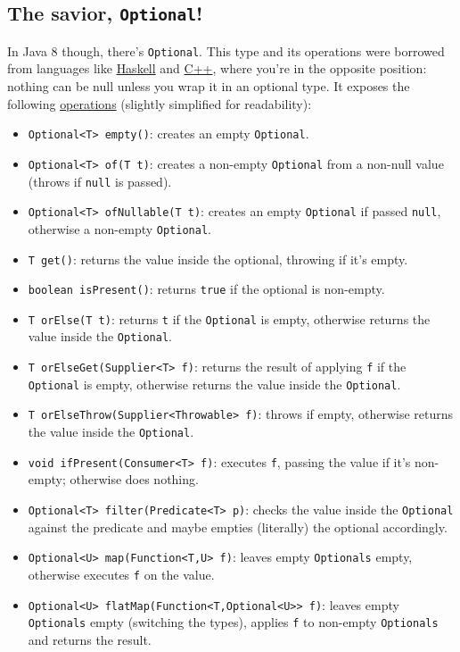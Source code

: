 \documentclass[11pt]{article}
\begin{document}
\subsection*{The savior, \texttt{Optional}!}
\label{sec:orgheadline3}
In Java 8 though, there's \texttt{Optional}. This type and its operations were borrowed from languages like \href{https://hackage.haskell.org/package/base/docs/Data-Maybe.html}{Haskell} and \href{http://en.cppreference.com/w/cpp/utility/optional/optional}{C++}, where you're in the opposite position: nothing can be null unless you wrap it in an optional type. It exposes the following \href{https://docs.oracle.com/javase/8/docs/api/java/util/Optional.html}{operations} (slightly simplified for readability):

\begin{itemize}
\item \texttt{Optional<T> empty()}: creates an empty \texttt{Optional}.
\item \texttt{Optional<T> of(T t)}: creates a non-empty \texttt{Optional} from a non-null value (throws if \texttt{null} is passed).
\item \texttt{Optional<T> ofNullable(T t)}: creates an empty \texttt{Optional} if passed \texttt{null}, otherwise a non-empty \texttt{Optional}.
\item \texttt{T get()}: returns the value inside the optional, throwing if it's empty.
\item \texttt{boolean isPresent()}: returns \texttt{true} if the optional is non-empty.
\item \texttt{T orElse(T t)}: returns \texttt{t} if the \texttt{Optional} is empty, otherwise returns the value inside the \texttt{Optional}.
\item \texttt{T orElseGet(Supplier<T> f)}: returns the result of applying \texttt{f} if the \texttt{Optional} is empty, otherwise returns the value inside the \texttt{Optional}.
\item \texttt{T orElseThrow(Supplier<Throwable> f)}: throws if empty, otherwise returns the value inside the \texttt{Optional}.
\item \texttt{void ifPresent(Consumer<T> f)}: executes \texttt{f}, passing the value if it's non-empty; otherwise does nothing.
\item \texttt{Optional<T> filter(Predicate<T> p)}: checks the value inside the \texttt{Optional} against the predicate and maybe empties (literally) the optional accordingly.
\item \texttt{Optional<U> map(Function<T,U> f)}: leaves empty \texttt{Optionals} empty, otherwise executes \texttt{f} on the value.
\item \texttt{Optional<U> flatMap(Function<T,Optional<U>> f)}: leaves empty \texttt{Optionals} empty (switching the types), applies \texttt{f} to non-empty \texttt{Optionals} and returns the result.
\end{itemize}
\end{document}
